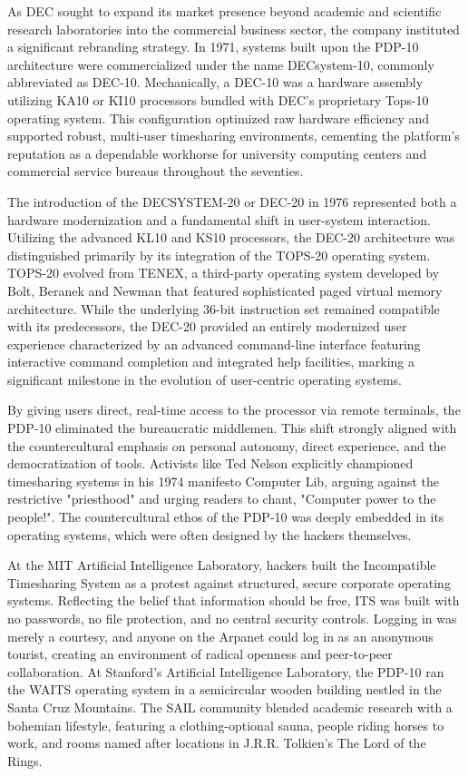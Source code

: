 As DEC sought to expand its market presence beyond academic and scientific research laboratories into the commercial business sector, the company instituted a significant rebranding strategy. In 1971, systems built upon the PDP-10 architecture were commercialized under the name DECsystem-10, commonly abbreviated as DEC-10. Mechanically, a DEC-10 was a hardware assembly utilizing KA10 or KI10 processors bundled with DEC’s proprietary Tops-10 operating system. This configuration optimized raw hardware efficiency and supported robust, multi-user timesharing environments, cementing the platform's reputation as a dependable workhorse for university computing centers and commercial service bureaus throughout the seventies.

The introduction of the DECSYSTEM-20 or DEC-20 in 1976 represented both a hardware modernization and a fundamental shift in user-system interaction. Utilizing the advanced KL10 and KS10 processors, the DEC-20 architecture was distinguished primarily by its integration of the TOPS-20 operating system. TOPS-20 evolved from TENEX, a third-party operating system developed by Bolt, Beranek and Newman that featured sophisticated paged virtual memory architecture. While the underlying 36-bit instruction set remained compatible with its predecessors, the DEC-20 provided an entirely modernized user experience characterized by an advanced command-line interface featuring interactive command completion and integrated help facilities, marking a significant milestone in the evolution of user-centric operating systems.

By giving users direct, real-time access to the processor via remote terminals, the PDP-10 eliminated the bureaucratic middlemen. This shift strongly aligned with the countercultural emphasis on personal autonomy, direct experience, and the democratization of tools. Activists like Ted Nelson explicitly championed timesharing systems in his 1974 manifesto Computer Lib, arguing against the restrictive "priesthood" and urging readers to chant, "Computer power to the people!". The countercultural ethos of the PDP-10 was deeply embedded in its operating systems, which were often designed by the hackers themselves. 

At the MIT Artificial Intelligence Laboratory, hackers built the Incompatible Timesharing System as a protest against structured, secure corporate operating systems. Reflecting the belief that information should be free, ITS was built with no passwords, no file protection, and no central security controls. Logging in was merely a courtesy, and anyone on the Arpanet could log in as an anonymous tourist, creating an environment of radical openness and peer-to-peer collaboration. At Stanford’s Artificial Intelligence Laboratory, the PDP-10 ran the WAITS operating system in a semicircular wooden building nestled in the Santa Cruz Mountains. The SAIL community blended academic research with a bohemian lifestyle, featuring a clothing-optional sauna, people riding horses to work, and rooms named after locations in J.R.R. Tolkien’s The Lord of the Rings.

